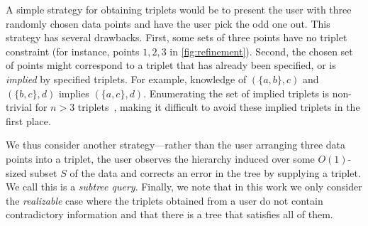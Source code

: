 

A simple strategy for obtaining triplets 
would be to present the user with three randomly
chosen data points and have the user pick the odd one out.
This strategy has several drawbacks.
First, some sets of three points have no triplet constraint 
(for instance, points $1,2,3$ in \autoref{fig:refinement}).
Second, the chosen set of points might correspond to a triplet
that has already been specified, or is {\it implied} by 
specified triplets. For example, knowledge of $(\{a, b\}, c)$ and
$(\{b, c\}, d)$ implies $(\{a, c\}, d)$.
Enumerating the set of implied
triplets is non-trivial for $n > 3$ triplets~\citep{Bryant1995},
making it difficult to avoid these implied triplets
in the first place.

We thus consider another strategy---rather
than the user arranging three data points into
a triplet, the user observes
the hierarchy induced over some $O(1)$-sized
subset $S$ of the data and corrects
an error in the tree by supplying a triplet.
We call this is a \emph{subtree query}.
Finally, we note that in this work
we only consider the \emph{realizable} case
where the triplets obtained
from a user do not contain contradictory information
and that there is a tree that satisfies
all of them.

%

